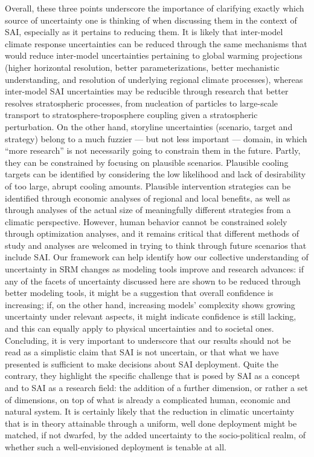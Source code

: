 \documentclass[draft]{agujournal2019}
\begin{document}
Overall, these three points underscore the importance of clarifying exactly which source of uncertainty one is thinking of when discussing them in the context of SAI, especially as it pertains to reducing them. It is likely that inter-model climate response uncertainties can be reduced through the same mechanisms that would reduce inter-model uncertainties pertaining to global warming projections (higher horizontal resolution, better parameterizations, better mechanistic understanding, and resolution of underlying regional climate processes), whereas inter-model SAI uncertainties may be reducible through research that better resolves stratospheric processes, from nucleation of particles to large-scale transport to stratosphere-troposphere coupling given a stratospheric perturbation. On the other hand, storyline uncertainties (scenario, target and strategy) belong to a much fuzzier --- but not less important --- domain, in which ``more research'' is not necessarily going to constrain them in the future. Partly, they can be constrained by focusing on plausible scenarios. Plausible cooling targets can be identified by considering the low likelihood and lack of desirability of too large, abrupt cooling amounts. Plausible intervention strategies can be identified through economic analyses of regional and local benefits, as well as through analyses of the actual size of meaningfully different strategies from a climatic perspective. However, human behavior cannot be constrained solely through optimization analyses, and it remains critical that different methods of study and analyses are welcomed in trying to think through future scenarios that include SAI. Our framework can help identify how our collective understanding of uncertainty in SRM changes as modeling tools improve and research advances: if any of the facets of uncertainty discussed here are shown to be reduced through better modeling tools, it might be a suggestion that overall confidence is increasing; if, on the other hand, increasing models' complexity shows growing uncertainty under relevant aspects, it might indicate confidence is still lacking, and this can equally apply to physical uncertainties and to societal ones.\\

Concluding, it is very important to underscore that our results should not be read as a simplistic claim that SAI is not uncertain, or that what we have presented is sufficient to make decisions about SAI deployment. Quite the contrary, they highlight the specific challenge that is posed by SAI as a concept and to SAI as a research field: the addition of a further dimension, or rather a set of dimensions, on top of what is already a complicated human, economic and natural system. It is certainly likely that the reduction in climatic uncertainty that is in theory attainable through a uniform, well done deployment might be matched, if not dwarfed, by the added uncertainty to the socio-political realm, of whether such a well-envisioned deployment is tenable at all.
\end{document}
